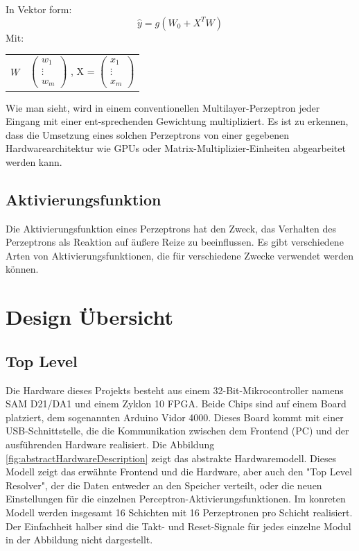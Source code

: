 \documentclass{article}
\makeatletter
\numberwithin{equation}{section}
\newenvironment{conditions}
{\par\vspace{\abovedisplayskip}
\noindent\begin{tabular}{>{$}l<{$} @{${}={}$} l}}
        {\end{tabular}\par\vspace{\belowdisplayskip}}
\makeatother
\begin{document}
In Vektor form:
\begin{equation}
    \hat y = g(W_0 + X^TW)
\end{equation}
Mit:
\begin{conditions}
    W & $\begin{pmatrix} w_1 \\ \vdots \\ w_m \end{pmatrix}$ , X = $\begin{pmatrix} x_1 \\ \vdots \\ x_m \end{pmatrix}$
\end{conditions}
Wie man sieht, wird in einem conventionellen Multilayer-Perzeptron jeder Eingang mit einer
ent-sprechenden Gewichtung multipliziert. Es ist zu erkennen, dass die Umsetzung
eines solchen Perzeptrons von einer gegebenen Hardwarearchitektur wie GPUs oder 
Matrix-Multiplizier-Einheiten abgearbeitet werden kann.

\subsection{Aktivierungsfunktion}
Die Aktivierungsfunktion eines Perzeptrons hat den Zweck, das
Verhalten des Perzeptrons als Reaktion auf äußere Reize zu beeinflussen. Es gibt 
verschiedene Arten von Aktivierungsfunktionen, die für verschiedene Zwecke verwendet 
werden können.

\pagebreak
\section{Design Übersicht}
\subsection{Top Level}
Die Hardware dieses Projekts besteht aus einem 32-Bit-Mikrocontroller namens SAM D21/DA1 und einem
Zyklon 10 FPGA. Beide Chips sind auf einem Board platziert, dem sogenannten Arduino Vidor 4000. Dieses Board
kommt mit einer USB-Schnittstelle, die die Kommunikation zwischen dem Frontend (PC) und
der ausführenden Hardware realisiert. Die Abbildung \ref{fig:abstractHardwareDescription} zeigt das
abstrakte Hardwaremodell. Dieses Modell zeigt das erwähnte Frontend und die Hardware, aber auch den
"Top Level Resolver", der die Daten entweder an den Speicher verteilt, oder die neuen Einstellungen 
für die einzelnen Perceptron-Aktivierungsfunktionen. Im konreten Modell werden insgesamt
16 Schichten mit 16 Perzeptronen pro Schicht realisiert. Der Einfachheit halber sind die 
Takt- und Reset-Signale für jedes einzelne Modul in der Abbildung nicht dargestellt.
\end{document}
